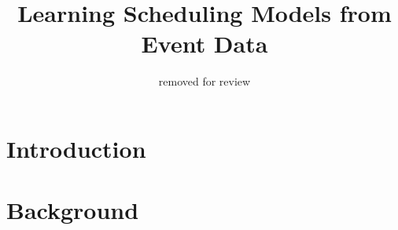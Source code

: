 \documentclass[letterpaper]{article}
\begin{document}
	
\title{Learning Scheduling Models from Event Data}



\author{removed for review\vspace{3.4em}}

\maketitle

\begin{abstract}

\end{abstract}








%



\section{Introduction}


\section{Background}




%
%
\end{document}
